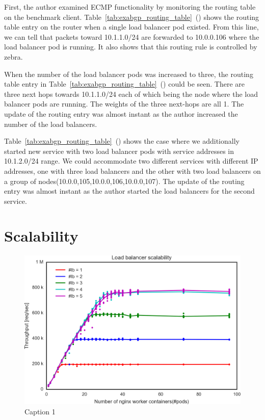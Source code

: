 First, the author examined ECMP functionality by monitoring the routing table on the benchmark client.
Table~\ref{tab:exabgp_routing_table}~() shows the routing table entry on the router when a single load balancer pod existed.
From this line, we can tell that packets toward 10.1.1.0/24 are forwarded to 10.0.0.106 where the load balancer pod is running.
It also shows that this routing rule is controlled by zebra.

When the number of the load balancer pods was increased to three, the routing table entry in Table~\ref{tab:exabgp_routing_table}~() could be seen.
There are three next hops towards 10.1.1.0/24 each of which being the node where the load balancer pods are running.
The weights of the three next-hops are all 1.
The update of the routing entry was almost instant as the author increased the number of the load balancers.

Table~\ref{tab:exabgp_routing_table}~() shows the case where we additionally started new service with two load balancer pods with service addresses in 10.1.2.0/24 range.
We could accommodate two different services with different IP addresses, one with three load balancers and the other with two load balancers on a group of nodes(10.0.0,105,10.0.0,106,10.0.0,107).
The update of the routing entry was almost instant as the author started the load balancers for the second service.

\FloatBarrier

\section{Scalability}

\begin{figure}[h]
  \includegraphics[width=0.9\columnwidth,left]{Figs/ecmp_lb_cubic}
  \caption{Caption 1}
  \label{fig:ecmp_lb_cubic}
\end{figure}

